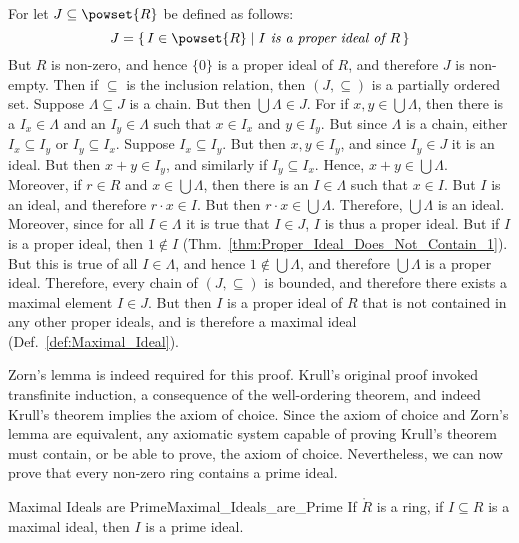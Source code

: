     \begin{bproof}
        For let $J\subseteq\powset{R}$ be defined as follows:
        \begin{equation}
            J=\{\,I\in\powset{R}\;|\;I\textit{ is a proper ideal of }R\,\}
        \end{equation}
        But $R$ is non-zero, and hence $\{0\}$ is a proper ideal of $R$,
        and therefore $J$ is non-empty. Then if $\subseteq$ is the inclusion
        relation, then $(J,\subseteq)$ is a partially ordered set. Suppose
        $\Lambda\subseteq{J}$ is a chain. But then $\bigcup\Lambda\in{J}$.
        For if $x,y\in\bigcup\Lambda$, then there is a $I_{x}\in\Lambda$ and
        an $I_{y}\in\Lambda$ such that $x\in{I}_{x}$ and $y\in{I}_{y}$. But
        since $\Lambda$ is a chain, either $I_{x}\subseteq{I}_{y}$ or
        $I_{y}\subseteq{I}_{x}$. Suppose $I_{x}\subseteq{I}_{y}$. But then
        $x,y\in{I}_{y}$, and since $I_{y}\in{J}$ it is an ideal. But then
        $x+y\in{I}_{y}$, and similarly if $I_{y}\subseteq{I}_{x}$. Hence,
        $x+y\in\bigcup\Lambda$. Moreover, if $r\in{R}$ and
        $x\in\bigcup\Lambda$, then there is an $I\in\Lambda$ such that
        $x\in{I}$. But $I$ is an ideal, and therefore $r\cdot{x}\in{I}$.
        But then $r\cdot{x}\in\bigcup\Lambda$. Therefore, $\bigcup\Lambda$
        is an ideal. Moreover, since for all $I\in\Lambda$ it is true that
        $I\in{J}$, $I$ is thus a proper ideal. But if $I$ is a proper ideal,
        then $1\not\in{I}$ (Thm.~\ref{thm:Proper_Ideal_Does_Not_Contain_1}).
        But this is true of all $I\in\Lambda$, and hence
        $1\notin\bigcup\Lambda$, and therefore $\bigcup\Lambda$ is a proper
        ideal. Therefore, every chain of $(J,\subseteq)$ is bounded, and
        therefore there exists a maximal element $I\in{J}$. But then $I$
        is a proper ideal of $R$ that is not contained in any other proper
        ideals, and is therefore a maximal ideal
        (Def.~\ref{def:Maximal_Ideal}).
    \end{bproof}
    Zorn's lemma is indeed required for this proof. Krull's original proof
    invoked transfinite induction, a consequence of the well-ordering
    theorem, and indeed Krull's theorem implies the axiom of choice. Since
    the axiom of choice and Zorn's lemma are equivalent, any axiomatic
    system capable of proving Krull's theorem must contain, or be able to
    prove, the axiom of choice. Nevertheless, we can now prove that every
    non-zero ring contains a prime ideal.
    \begin{ltheorem}{Maximal Ideals are Prime}{Maximal_Ideals_are_Prime}
        If $\ring{R}$ is a ring, if $I\subseteq{R}$ is a maximal ideal, then
        $I$ is a prime ideal.
    \end{ltheorem}
